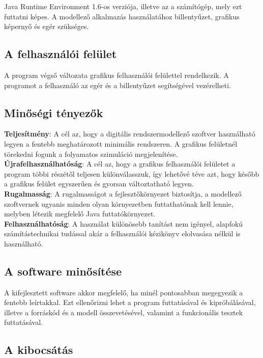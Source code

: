 Java Runtime Environment 1.6-os verziója, illetve az a számítógép, mely ezt futtatni képes. A modellező alkalmazás használatához billentyűzet, grafikus képernyő és egér szükséges.

\subsection{A felhasználói felület}

A program végső változata grafikus felhasználói felülettel rendelkezik. A programot a felhasználó az egér és a billentyűzet segítségével vezérelheti.

\subsection{Minőségi tényezők}

\textbf{Teljesítmény}: A cél az, hogy a digitális rendszermodellező szoftver használható legyen a fentebb meghatározott minimális rendszeren. A grafikus felületnél törekedni fogunk a folyamatos szimuláció megjelenítése.\\
\textbf{Újrafelhasználhatóság}: A cél az, hogy a grafikus felhasználói felületet a program többi részétől teljesen különválasszuk, így lehetővé téve azt, hogy később a grafikus felület egyszerűen és gyorsan változtatható legyen.\\
\textbf{Rugalmasság}: A rugalmasságot a fejlesztőkörnyezet biztosítja, a modellező szoftvernek ugyanis minden olyan környezetben futtathatónak kell lennie, melyben létezik megfelelő Java futtatókörnyezet.\\
\textbf{Felhasználhatóság}: A használat különösebb tanítást nem igényel, alapfokú számítástechnikai tudással akár a felhasználói kézikönyv elolvasása nélkül is használható.

\subsection{A software minősítése}

A kifejlesztett software akkor megfelelő, ha minél pontosabban megegyezik a fentebb leírtakkal. Ezt ellenőrizni lehet a program futtatásával és kipróbálásával, illetve a forráskód és a modell összevetésével, valamint a funkcionális tesztek futtatásával.

\subsection{A kibocsátás}

